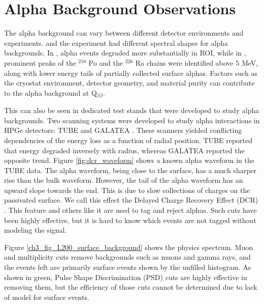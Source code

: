 \section{Alpha Background Observations}
\label{ch3_sec_alpha}
The alpha background can vary between different detector environments and experiments. {\MJD} and the {\Gerda} experiment had different spectral shapes for alpha backgrounds. In {\MJD}, alpha events degraded more substantially in {\onbb} ROI, while in \Gerda, prominent peaks of the $^{210}$ Po and the $^{226}$ Ra chains were identified above $5$ MeV, along with lower energy tails of partially collected surface alphas. Factors such as the cryostat environment, detector geometry, and material purity can contribute to the alpha background at Q$_{\beta\beta}$.

This can also be seen in dedicated test stands that were developed to study alpha backgrounds. Two scanning systems were developed to study alpha interactions in HPGe detectors: TUBE \cite{TUBE_paper} and GALATEA \cite{galatea_paper}. These scanners yielded conflicting dependencies of the energy loss as a function of radial position. TUBE reported that energy degraded inversely with radius, whereas GALATEA reported the opposite trend. Figure \ref{fig:dcr_waveform} shows a known alpha waveform in the TUBE data. The alpha waveform, being close to the surface, has a much sharper rise than the bulk waveform. However, the tail of the alpha waveform has an upward slope towards the end. This is due to slow collections of charges on the passivated surface. We call this effect the Delayed Charge Recovery Effect (DCR) \cite{Gruszko:2017kfx}. This feature and others like it are used to tag and reject alphas. Such cuts have been highly effective, but it is hard to know which events are not tagged without modeling the signal.

Figure \ref{ch3_fig_L200_surface_background} shows the {\Ltwo} physics spectrum. Muon and multiplicity cuts remove backgrounds such as muons and gamma rays, and the events left are primarily surface events shown by the unfilled histogram. As shown in green, Pulse Shape Discrimination (PSD) cuts are highly effective in removing them, but the efficiency of those cuts cannot be determined due to lack of model for surface events. 

